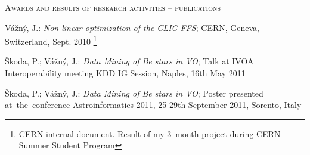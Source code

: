 \begin{cv}
\begin{cvlist}{\large \textsc{Awards and results of research activities -- publications}}





 \item {Vážný}, J.: \textit{Non-linear optimization of the CLIC FFS};
   CERN, Geneva, Switzerland, Sept. 2010 \footnote{CERN internal
     document. Result of my 3~month project during CERN Summer Student
     Program}

\item {Škoda}, P.; {Vážný}, J.: \textit{Data Mining of Be stars in VO};
    Talk at IVOA Interoperability meeting KDD IG Session, Naples, 16th May
    2011 

\item {Škoda}, P.; {Vážný}, J.: \textit{Data Mining of Be stars in VO};
    Poster presented at~the~conference Astroinformatics 2011, 25-29th
    September 2011, Sorento, Italy


\end{cvlist}
\end{cv}
